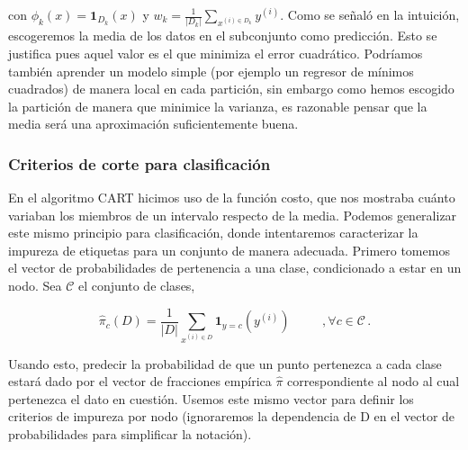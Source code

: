 con $\phi_k(x) = \mathbf{1}_{D_k}(x)$ y $w_k = \frac{1}{|D_k|} \sum_{x^{(i) \in D_k}} y^{(i)}$. Como se señaló en la intuición, escogeremos la media de los datos en el subconjunto como predicción. Esto se justifica pues aquel valor es el que minimiza el error cuadrático. Podríamos también aprender un modelo simple (por ejemplo un regresor de mínimos cuadrados) de manera local en cada partición, sin embargo como hemos escogido la partición de manera que minimice la varianza, es razonable pensar que la media será una aproximación suficientemente buena.


\subsubsection{Criterios de corte para clasificación}

En el algoritmo CART hicimos uso de la función costo, que nos mostraba cuánto variaban los miembros de un intervalo respecto de la media. Podemos generalizar este mismo principio para clasificación, donde intentaremos caracterizar la impureza de etiquetas para un conjunto de manera adecuada. Primero tomemos el vector de probabilidades de pertenencia a una clase, condicionado a estar en un nodo. Sea $\mathcal{C}$ el conjunto de clases,

\begin{equation}
    \hat \pi_c (D) = \frac{1}{|D|} \sum_{x^{(i) \in D}} \mathbf{1}_{y=c}(y^{(i)}) \hspace{1cm} \,, \forall c \in \mathcal{C} \,.
\end{equation}

Usando esto, predecir la probabilidad de que un punto pertenezca a cada clase estará dado por el vector de fracciones empírica $\hat \pi$ correspondiente al nodo al cual pertenezca el dato en cuestión. Usemos este mismo vector para definir los criterios de impureza por nodo (ignoraremos la dependencia de D en el vector de probabilidades para simplificar la notación).

